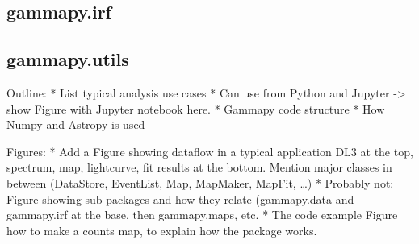 \subsection{gammapy.irf}
\subsection{gammapy.utils}



Outline:
* List typical analysis use cases
* Can use from Python and Jupyter -> show Figure with Jupyter notebook here.
* Gammapy code structure
* How Numpy and Astropy is used


Figures:
* Add a Figure showing dataflow in a typical application
DL3 at the top, spectrum, map, lightcurve, fit results at the bottom.
Mention major classes in between (DataStore, EventList, Map, MapMaker, MapFit, …)
* Probably not: Figure showing sub-packages and how they relate (gammapy.data and gammapy.irf at the base, then gammapy.maps, etc.
* The code example Figure how to make a counts map, to explain how the package works.
